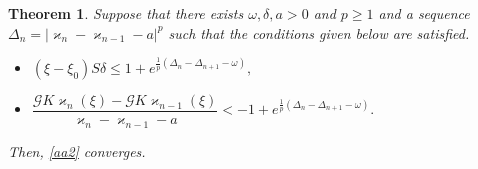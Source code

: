 \documentclass[pdflatex,sn-mathphys-num]{sn-jnl}%
\theoremstyle{thmstyleone}%
\newtheorem{theorem}{Theorem}%
\theoremstyle{thmstyletwo}%
\theoremstyle{thmstylethree}%
\begin{document}
\begin{theorem}\label{appth}
     Suppose that there exists $\omega  ,\delta,a>0$ and $p\ge 1$ and a sequence $\Delta_n=|\varkappa_{n}-\varkappa_{n-1}-a|^p$ such that the conditions given below are satisfied.

\begin{itemize}
\item[(F$_1$)] $(\xi - \xi_0)S\delta \le 1 + e^{\frac{1}{p}(\Delta_n-\Delta_{n+1}-\omega  )},$
\item[(F$_2$)] $\dfrac{\mathcal{G}K\varkappa_{n}(\xi) - \mathcal{G}K\varkappa_{n-1}(\xi)}{\varkappa_n - \varkappa_{n-1}-a} < -1 + e^{\frac{1}{p}(\Delta_n-\Delta_{n+1}-\omega  )}.$
\end{itemize}

Then, \eqref{aa2} converges.
\end{theorem}
\end{document}
